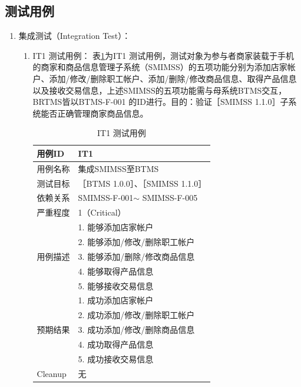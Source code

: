 		\subsection{测试用例}
			\begin{enumerate}

			\item 集成测试（Integration Test）：
				\begin{enumerate}

				\item IT1 测试用例：
					表\ref{IT1TestCase}为IT1 测试用例，测试对象为参与者商家装载于手机的商家和商品信息管理子系统（SMIMSS）的五项功能分别为添加店家帐户、添加/修改/删除职工帐户、添加/删除/修改商品信息、取得产品信息以及接收交易信息，上述SMIMSS的五项功能需与母系统BTMS交互，BRTMS皆以BTMS-F-001 的ID进行。目的：验证［SMIMSS 1.1.0］子系统能否正确管理商家商品信息。

					\begin{table}[!htbp]
					\centering
					\caption{IT1 测试用例}
					\label{IT1TestCase}
					\begin{tabular}{|l|l|}
					\hline
					用例ID & IT1 \\ \hline
					用例名称 & 集成SMIMSS至BTMS \\ \hline
					测试目标 & {［}BTMS 1.0.0{］}、{［}SMIMSS 1.1.0{］} \\ \hline
					依赖关系 & SMIMSS-F-001$\sim$ SMIMSS-F-005 \\ \hline
					严重程度 & 1（Critical） \\ \hline
					\multirow{5}{*}{用例描述} & 1.     能够添加店家帐户 \\ \cline{2-2} 
					 & 2.     能够添加/修改/删除职工帐户 \\ \cline{2-2} 
					 & 3.     能够添加/删除/修改商品信息 \\ \cline{2-2} 
					 & 4.     能够取得产品信息 \\ \cline{2-2} 
					 & 5.     能够接收交易信息 \\ \hline
					\multirow{5}{*}{预期结果} & 1.     成功添加店家帐户 \\ \cline{2-2} 
					 & 2.     成功添加/修改/删除职工帐户 \\ \cline{2-2} 
					 & 3.     成功添加/修改/删除商品信息 \\ \cline{2-2} 
					 & 4.     成功取得产品信息 \\ \cline{2-2} 
					 & 5.     成功接收交易信息 \\ \hline
					Cleanup & 无 \\ \hline
					\end{tabular}
					\end{table}



\end{enumerate}
\end{enumerate}
